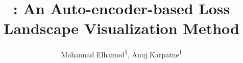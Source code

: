 \documentclass[letterpaper]{article} %
\title{\proposedautencoder: An Auto-encoder-based Loss Landscape Visualization Method}
\author {
    Mohannad Elhamod\textsuperscript{\rm 1},
    Anuj Karpatne\textsuperscript{\rm 1}
}
\begin{document}
\newcommand{\proposedautencoder}{\textit{Neuro-Visualizer}}
\newcommand{\grid}{\mathcal{G}}
\newcommand{\manifold}{\mathcal{L}}
\newcommand{\trajectorymodels}{\mathcal{M_T}}
\newcommand{\gridpoints}{\mathcal{M_G}}
\newcommand{\trajectory}{\mathcal{T}}
\newcommand{\proposedautencodermodel}{\mathcal{N}}
\newcommand{\encoderlandscape}{\mathit{E}_\proposedautencodermodel}
\newcommand{\decoderlandscape}{\mathit{D}_\proposedautencodermodel}
\newcommand{\SGML}{\emph{KGML}}
\newcommand{\Lmse}{\mathrm{L_{phy\text{-}MSE}}}
\newcommand{\Ltri}{\mathrm{L_{phy\text{-}TRI}}}
\newcommand{\cophy}{\emph{CoPhy}-PGNN}
\newcommand{\PGNN}{\emph{PGNN}}
\newcommand{\eigenvec}{\boldsymbol{y}}
\newcommand{\eigenval}{b}
\newcommand{\eigenmat}{\hat{A}}
\newcommand{\nsloss}{$C$-Loss{}}
\newcommand{\eloss}{$S$-Loss}
\newcommand{\lfmodel}{\emph{CoPhy}-PGNN (Label-free)}
\newcommand{\nexmodel}{\emph{CoPhy}-PGNN (only-$\mathcal{D}_{Tr}$)}
\newcommand{\nn}{Black-box Neural Network}
\newcommand{\ncmodel}{PGNN-\emph{analogue}}
\newcommand{\BB}{black\text{-}box}
\newcommand{\lres}{\text{L}_{r}}
\newcommand{\lic}{\text{L}_{ic}}
\newcommand{\lbc}{\text{L}_{bc}}
\newcommand{\lrec}{\text{L}_{rec}}
\newcommand{\lanch}{\text{L}_{anch}}
\newcommand{\ltraj}{\text{L}_{traj}}
\newcommand{\lgrid}{\text{L}_{grid}}
\newcommand{\crec}{\text{c}_{rec}}
\newcommand{\canch}{\text{c}_{anch}}
\newcommand{\ctraj}{\text{c}_{traj}}
\newcommand{\cgrid}{\text{c}_{grid}}
\newcommand{\cres}{\text{c}_{r}}
\newcommand{\cic}{\text{c}_{ic}}
\newcommand{\cbc}{\text{c}_{bc}}
\newcommand{\ltest}{\text{L}_{test}}
\newcommand{\rlw}{\textit{RLW}}
\newcommand{\cw}{\textit{CW}}
\newcommand{\ew}{\textit{EW}}
\newcommand{\dwa}{\textit{DWA}}
\newcommand{\lranneal}{\textit{LR}$_{\textit{annealing}}$}
\newcommand{\gradnorm}{\textit{GradNorm}}
\newcommand{\lmax}{l^{max}}


\makeatletter %
\def\showauthors@on{T}
\makeatother %

\maketitle
\end{document}
